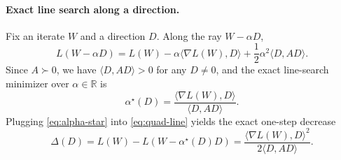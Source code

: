 \documentclass{article}
\theoremstyle{plain}
\theoremstyle{definition}
\theoremstyle{remark}
\newcommand{\R}{\mathbb{R}}
\newcommand{\loss}{L}
\begin{document}
\paragraph{Exact line search along a direction.}
Fix an iterate $W$ and a direction $D$.
Along the ray $W-\alpha D$,
\begin{equation}
\loss(W-\alpha D)
=
\loss(W)
-
\alpha \langle \nabla \loss(W), D\rangle
+
\frac12 \alpha^2 \langle D, A D\rangle .
\label{eq:quad-line}
\end{equation}
Since $A\succ 0$, we have $\langle D, A D\rangle>0$ for any $D\neq 0$, and the exact line-search minimizer over $\alpha\in\R$ is
\begin{equation}
\alpha^\star(D)
=
\frac{\langle \nabla \loss(W), D\rangle}{\langle D, A D\rangle}.
\label{eq:alpha-star}
\end{equation}
Plugging \eqref{eq:alpha-star} into \eqref{eq:quad-line} yields the exact one-step decrease
\begin{equation}
\Delta(D)
=
\loss(W)-\loss(W-\alpha^\star(D)D)
=
\frac{\langle \nabla \loss(W), D\rangle^2}{2\langle D, A D\rangle}.
\label{eq:delta-app}
\end{equation}

\end{document}
